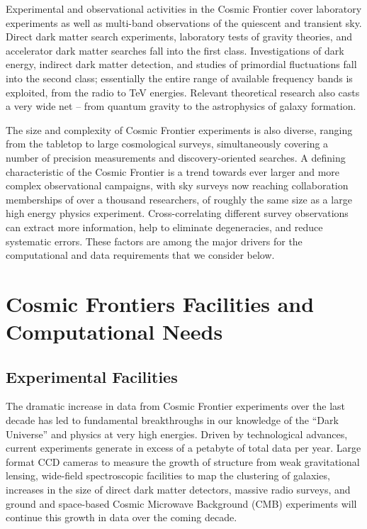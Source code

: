 Experimental and observational activities in the Cosmic Frontier cover
laboratory experiments as well as multi-band observations of the
quiescent and transient sky. Direct dark matter search experiments,
laboratory tests of gravity theories, and accelerator dark matter
searches fall into the first class. Investigations of dark energy,
indirect dark matter detection, and studies of primordial fluctuations
fall into the second class; essentially the entire range of available
frequency bands is exploited, from the radio to TeV energies. Relevant
theoretical research also casts a very wide net -- from quantum
gravity to the astrophysics of galaxy formation.

The size and complexity of Cosmic Frontier experiments is also
diverse, ranging from the tabletop to large cosmological surveys,
simultaneously covering a number of precision measurements and
discovery-oriented searches. A defining characteristic of the Cosmic
Frontier is a trend towards ever larger and more complex observational
campaigns, with sky surveys now reaching collaboration memberships of
over a thousand researchers, of roughly the same size as a large high
energy physics experiment. Cross-correlating different survey
observations can extract more information, help to eliminate
degeneracies, and reduce systematic errors. These factors are among
the major drivers for the computational and data requirements that we
consider below.

\section{Cosmic Frontiers Facilities and Computational Needs}

\subsection{Experimental Facilities}
The dramatic increase in data from Cosmic Frontier experiments over
the last decade has led to fundamental breakthroughs in our knowledge
of the ``Dark Universe'' and physics at very high energies. Driven by
technological advances, current experiments generate in excess of a
petabyte of total data per year. Large format CCD cameras to measure
the growth of structure from weak gravitational lensing, wide-field
spectroscopic facilities to map the clustering of galaxies, increases
in the size of direct dark matter detectors, massive radio surveys,
and ground and space-based Cosmic Microwave Background (CMB)
experiments will continue this growth in data over the coming decade.

